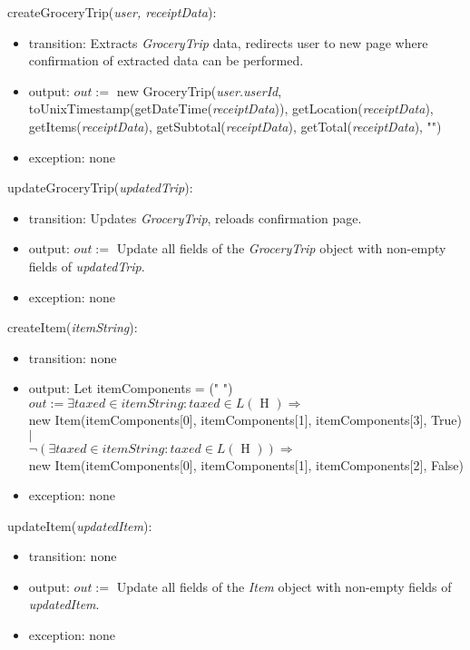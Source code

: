\documentclass[12pt, titlepage]{article}
\begin{document}
\noindent createGroceryTrip(\textit{user, receiptData}):
\begin{itemize}
  \item transition: Extracts \textit{GroceryTrip} data, redirects user to new page where confirmation
of extracted data can be performed.
  \item output: $out :=$ new GroceryTrip(\textit{user.userId}, toUnixTimestamp(getDateTime(\textit{receiptData})), getLocation(\textit{receiptData}),
                        getItems(\textit{receiptData}), getSubtotal(\textit{receiptData}), getTotal(\textit{receiptData}), "")
  \item exception: none
\end{itemize}

\noindent updateGroceryTrip(\textit{updatedTrip}):
\begin{itemize}
  \item transition: Updates \textit{GroceryTrip}, reloads confirmation page.
  \item output: $out :=$ Update all fields of the \textit{GroceryTrip} object with non-empty fields of \textit{updatedTrip}.
  \item exception: none
\end{itemize}

\noindent createItem(\textit{itemString}):
\begin{itemize}
  \item transition: none
  \item output: Let itemComponents = (" ") \\
                $out := \exists taxed \in itemString : taxed \in L(\text{ H }) \Rightarrow$ \\
                new Item(itemComponents[0], itemComponents[1], itemComponents[3], True) $|$ \\
                $\neg(\exists taxed \in itemString : taxed \in L(\text{ H })) \Rightarrow$ \\
                new Item(itemComponents[0], itemComponents[1], itemComponents[2], False)
  \item exception: none
\end{itemize}

\noindent updateItem(\textit{updatedItem}):
\begin{itemize}
  \item transition: none
  \item output: $out :=$ Update all fields of the \textit{Item} object with non-empty fields of \textit{updatedItem}.
  \item exception: none
\end{itemize}
\end{document}
